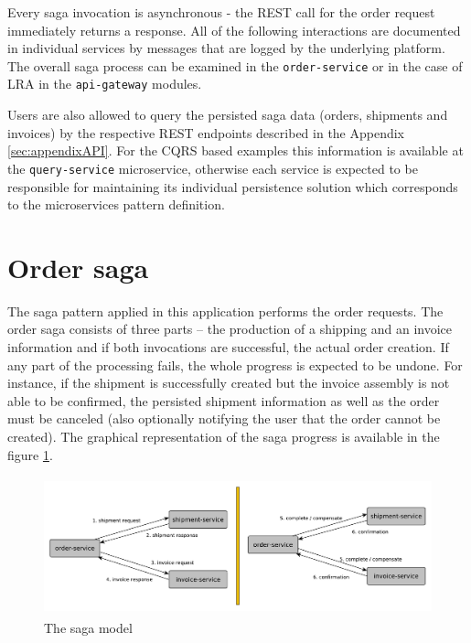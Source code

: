 \documentclass[oneside,
  digital, %
  table,   %
  lof,     %
  lot,     %
]{fithesis3}
\begin{document}
Every saga invocation is asynchronous - the REST call for the order request immediately returns a response. All of the following interactions are documented in individual services by messages that are logged by the underlying platform. The overall saga process can be examined in the \texttt{order-service} or in the case of LRA in the \texttt{api-gateway} modules.

Users are also allowed to query the persisted saga data (orders, shipments and invoices) by the respective REST endpoints described in the Appendix \ref{sec:appendixAPI}. For the CQRS based examples this information is available at the \texttt{query-service} microservice, otherwise each service is expected to be responsible for maintaining its individual persistence solution which corresponds to the microservices pattern definition.

\section{Order saga}

The saga pattern applied in this application performs the order requests. The order saga consists of three parts -- the production of a shipping and an invoice information and if both invocations are successful, the actual order creation. If any part of the processing fails, the whole progress is expected to be undone. For instance, if the shipment is successfully created but the invoice assembly is not able to be confirmed, the persisted shipment information as well as the order must be canceled (also optionally notifying the user that the order cannot be created). The graphical representation of the saga progress is available in the figure \ref{fig:saga-model}.

\begin{figure}
    \begin{center}
        \includegraphics[height=40mm]{images/sagaModel.pdf}
    \end{center}
    \caption{The saga model}
    \label{fig:saga-model}
\end{figure}
\end{document}
